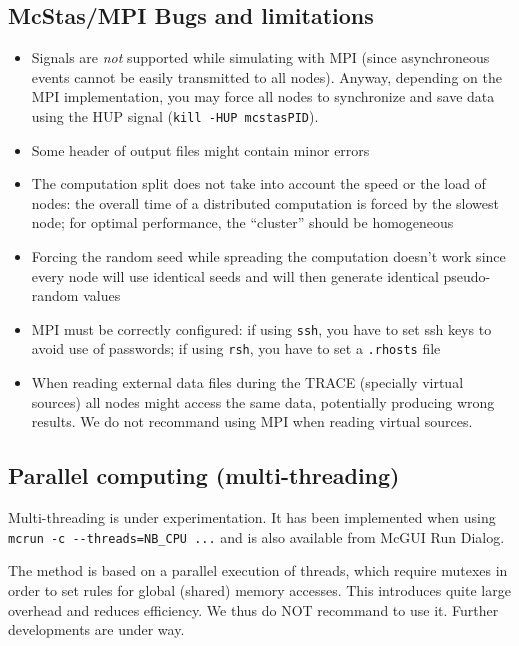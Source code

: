\subsection{McStas/MPI Bugs and limitations}

\begin{itemize}
\item Signals are \emph{not} supported while simulating with MPI (since
  asynchroneous events cannot be easily transmitted to all nodes). Anyway,
  depending on the MPI implementation, you may force all nodes to synchronize
  and save data using the HUP signal (\verb'kill -HUP mcstasPID').
\item Some header of output files might contain minor errors
\item The computation split does not take into account the speed or the
  load of nodes: the overall time of a distributed computation is
  forced by the slowest node; for optimal performance, the ``cluster''
  should be homogeneous
\item Forcing the random seed while spreading the computation doesn't
  work since every node will use identical seeds and will then
  generate identical pseudo-random values
\item MPI must be correctly configured: if using \verb'ssh', you
  have to set ssh keys to avoid use of passwords; if
  using \verb'rsh', you have to set a \verb'.rhosts' file
\item When reading external data files during the TRACE (specially virtual sources) all nodes might access the same data, potentially producing wrong results. We do not recommand using MPI when reading virtual sources.
\end{itemize}

\subsection{Parallel computing (multi-threading)}

Multi-threading is under experimentation. It has been implemented when using \\\verb+mcrun -c --threads=NB_CPU ...+ and is also available from McGUI Run Dialog.

The method is based on a parallel execution of threads, which require mutexes in order to set rules for global (shared) memory accesses. This introduces quite large overhead and reduces efficiency. We thus do NOT recommand to use it. Further developments are under way.
